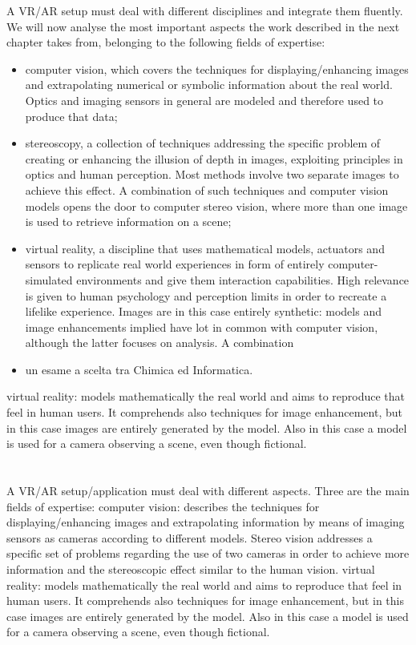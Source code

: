 A VR/AR setup must deal with different disciplines and integrate them fluently. We will now analyse the most important aspects the work described in the next chapter takes from, belonging to the following fields of expertise:
\begin{itemize}
\item
computer vision, which covers the techniques for displaying/enhancing images and extrapolating numerical or symbolic information about the real world. Optics and imaging sensors in general are modeled and therefore used to produce that data;
\item
stereoscopy, a collection of techniques addressing the specific problem of creating or enhancing the illusion of depth in images, exploiting principles in optics and human perception. Most methods involve two separate images to achieve this effect. A combination of such techniques and computer vision models opens the door to computer stereo vision, where more than one image is used to retrieve information on a scene;
\item
virtual reality, a discipline that uses mathematical models, actuators and sensors to replicate real world experiences in form of entirely computer-simulated environments and give them interaction capabilities. High relevance is given to human psychology and perception limits in order to recreate a lifelike experience. Images are in this case entirely synthetic: models and image enhancements implied have lot in common with computer vision, although the latter focuses on analysis. A combination
\item
un esame a scelta tra Chimica ed Informatica.
\end{itemize}

virtual reality: models mathematically the real world and aims to reproduce that feel in human users. It comprehends also techniques for image enhancement, but in this case images are entirely generated by the model. Also in this case a model is used for a camera observing a scene, even though fictional.

\section{}
A VR/AR setup/application must deal with different aspects. Three are the main fields of expertise:
computer vision: describes the techniques for displaying/enhancing images and extrapolating information by means of imaging sensors as cameras according to different models. Stereo vision addresses a specific set of  problems regarding the use of two cameras in order to achieve more information and the stereoscopic effect similar to the human vision.
virtual reality: models mathematically the real world and aims to reproduce that feel in human users. It comprehends also techniques for image enhancement, but in this case images are entirely generated by the model. Also in this case a model is used for a camera observing a scene, even though fictional.
